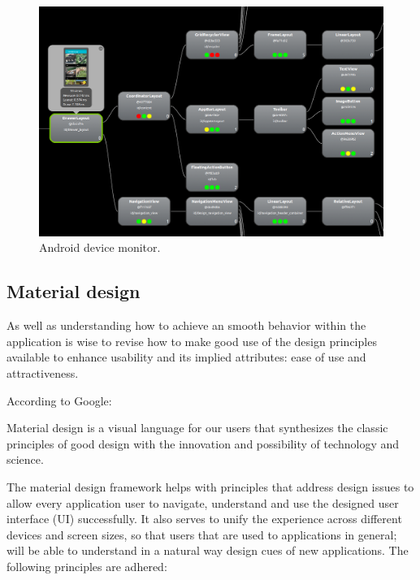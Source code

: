 \begin{figure}[H]
\begin{adjustbox}{width=1\textwidth,center=\textwidth}
  \centering
  \includegraphics[scale=1]{images/android_device_monitor_2.png}
\end{adjustbox}
  \caption[Andrroid activities lifecycle]{Android device monitor.}
  \label{fig:android_device_monitor}
\end{figure}

\subsection{Material design}
As well as understanding how to achieve an smooth behavior within the application is wise to revise how to make good use of the design principles available to enhance usability and its implied attributes: ease of use and attractiveness. 

According to Google: \begin{displayquote}Material design is  a visual language for our users that synthesizes the classic principles of good design with the innovation and possibility of technology and science. \end{displayquote} 

The material design framework helps with principles that address design issues to allow every application user to navigate, understand and use the designed user interface (UI) successfully. It also serves to unify the experience across different devices and screen sizes, so that users that are used to applications in general; will be able to understand in a natural way design cues of new applications. The following principles are adhered:   


